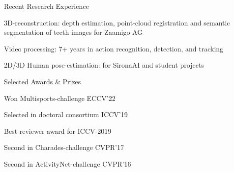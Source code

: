 \documentclass{resume} %
\begin{document}
\begin{paracol}{2}
\begin{rSection}{Recent Research Experience}{} 
\begin{sSubsection}{3D-reconstruction: depth estimation, point-cloud registration and semantic segmentation of teeth images for Zaamigo AG}\end{sSubsection}
\begin{sSubsection}{Video processing: 7+ years in action recognition, detection, and tracking}\end{sSubsection}
\begin{sSubsection}{ 2D/3D Human pose-estimation: for SironaAI and student projects}\end{sSubsection}

\end{rSection}
\switchcolumn
\vspace{0.75mm}
\begin{rSection}{Selected Awards \& Prizes}{}
\begin{sSubsection}{Won Multisports-challenge ECCV'22}\end{sSubsection} %
\begin{sSubsection}{Selected in doctoral consortium ICCV'19}\end{sSubsection}  %
\begin{sSubsection}{Best reviewer award for ICCV-2019}\end{sSubsection} %
\begin{sSubsection}{Second in Charades-challenge CVPR'17}\end{sSubsection} %
\begin{sSubsection}{Second in ActivityNet-challenge CVPR'16}\end{sSubsection} %
\end{rSection}


\end{paracol}
\end{document}
